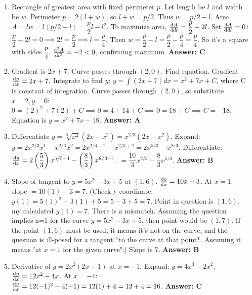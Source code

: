 \begin{enumerate}[label={\arabic*.}]
  \item Rectangle of greatest area with fixed perimeter \(p\).
    Let length be \(l\) and width be \(w\). Perimeter \(p = 2(l+w)\), so \(l+w = p/2\). Thus \(w = p/2 - l\).
    Area \(A = lw = l(p/2 - l) = \dfrac{p}{2}l - l^2\).
    To maximize area, \(\frac{\mathrm{d}A}{\mathrm{d}dl} = \dfrac{p}{2} - 2l\).
    Set \(\frac{\mathrm{d}A}{\mathrm{d}dl}=0\): \(\dfrac{p}{2} - 2l = 0 \implies 2l = \dfrac{p}{2} \implies l = \dfrac{p}{4}\).
    Then \(w = \dfrac{p}{2} - l = \dfrac{p}{2} - \dfrac{p}{4} = \dfrac{p}{4}\).
    So it's a square with sides \(\dfrac{p}{4}\).
    \(\frac{\mathrm{d}^2 A}{\mathrm{d} l^2} = -2 < 0\), confirming maximum.
    \textbf{Answer: C}

  \item Gradient is \(2x+7\). Curve passes through \((2,0)\). Find equation.
    Gradient \(\frac{\mathrm{d}y}{\mathrm{d}x} = 2x+7\).
    Integrate to find \(y\): \(y = \int (2x+7) dx = x^2 + 7x + C\), where C is constant of integration.
    Curve passes through \((2,0)\), so substitute \(x=2, y=0\):
    \(0 = (2)^2 + 7(2) + C \implies 0 = 4 + 14 + C \implies 0 = 18 + C \implies C = -18\).
    Equation is \(y = x^2 + 7x - 18\).
    \textbf{Answer: A}

  \item Differentiate \(y = \sqrt[3]{x^2}(2x-x^2) = x^{2/3}(2x-x^2)\).
    Expand: \(y = 2x^{2/3}x^1 - x^{2/3}x^2 = 2x^{2/3+1} - x^{2/3+2} = 2x^{5/3} - x^{8/3}\).
    Differentiate: \(\frac{\mathrm{d}y}{\mathrm{d}x} = 2\left(\dfrac{5}{3}\right)x^{5/3-1} - \left(\dfrac{8}{3}\right)x^{8/3-1}\).
    \(= \dfrac{10}{3}x^{2/3} - \dfrac{8}{3}x^{5/3}\).
    \textbf{Answer: B}

  \item Slope of tangent to \(y = 5x^2 - 3x + 5\) at \((1,6)\).
    \(\frac{\mathrm{d}y}{\mathrm{d}x} = 10x - 3\).
    At \(x=1\): slope \(= 10(1) - 3 = 7\).
    (Check y-coordinate: \(y(1) = 5(1)^2-3(1)+5 = 5-3+5=7\). Point in question is \((1,6)\), my calculated \(y(1)=7\). There is a mismatch. Assuming the question implies x=1 for the curve \(y=5x^2-3x+5\), then point would be \((1,7)\). If the point \((1,6)\) must be used, it means it's not on the curve, and the question is ill-posed for a tangent *to the curve at that point*. Assuming it means "at \(x=1\) for the given curve":)
    Slope is 7.
    \textbf{Answer: B}

  \item Derivative of \(y = 2x^2(2x-1)\) at \(x=-1\).
    Expand: \(y = 4x^3 - 2x^2\).
    \(\frac{\mathrm{d}y}{\mathrm{d}x} = 12x^2 - 4x\).
    At \(x=-1\): \(\frac{\mathrm{d}y}{\mathrm{d}x} = 12(-1)^2 - 4(-1) = 12(1) + 4 = 12 + 4 = 16\).
    \textbf{Answer: C}


\end{enumerate}
